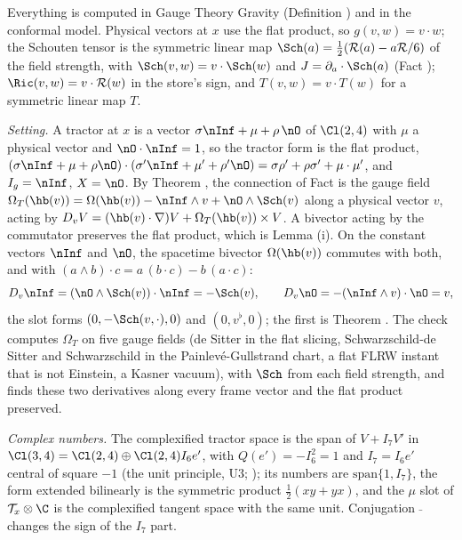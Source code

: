 Everything is computed in Gauge Theory Gravity (Definition ) and in the conformal model. Physical vectors at $x$ use the flat product, so $g(v, w) = v\cdot w$; the Schouten tensor is the symmetric linear map $\Sch(a) = \tfrac12(\mathcal{R}(a) - a\mathcal{R}/6)$ of the field strength, with $\Sch(v, w) = v\cdot\Sch(w)$ and $J = \partial_{a}\cdot\Sch(a)$ (Fact ); $\Ric(v, w) = v\cdot\mathcal{R}(w)$ in the store's sign, and $T(v, w) = v\cdot T(w)$ for a symmetric linear map $T$.

\emph{Setting.} A tractor at $x$ is a vector $\sigma\nInf + \mu + \rho\,\nO$ of $\Cl(2,4)$ with $\mu$ a physical vector and $\nO\cdot\nInf = 1$, so the tractor form is the flat product, $(\sigma\nInf + \mu + \rho\nO)\cdot(\sigma'\nInf + \mu' + \rho'\nO) = \sigma\rho' + \rho\sigma' + \mu\cdot\mu'$, and $I_g = \nInf$, $X = \nO$. By Theorem , the connection of Fact  is the gauge field $\Omega_{T}(\hb(v)) = \Omega(\hb(v)) - \nInf\wedge v + \nO\wedge\Sch(v)$ along a physical vector $v$, acting by $D_{v}V = (\hb(v)\cdot\nabla)V + \Omega_{T}(\hb(v))\times V$. A bivector acting by the commutator preserves the flat product, which is Lemma (i). On the constant vectors $\nInf$ and $\nO$, the spacetime bivector $\Omega(\hb(v))$ commutes with both, and with $(a\wedge b)\cdot c = a\,(b\cdot c) - b\,(a\cdot c)$:
\[
D_{v}\nInf = (\nO\wedge\Sch(v))\cdot\nInf = -\Sch(v), \qquad D_{v}\nO = -(\nInf\wedge v)\cdot\nO = v,
\]
the slot forms $(0, -\Sch(v,\cdot), 0)$ and $(0, v^{\flat}, 0)$; the first is Theorem . The check computes $\Omega_{T}$ on five gauge fields (de Sitter in the flat slicing, Schwarzschild-de Sitter and Schwarzschild in the Painlev\'e-Gullstrand chart, a flat FLRW instant that is not Einstein, a Kasner vacuum), with $\Sch$ from each field strength, and finds these two derivatives along every frame vector and the flat product preserved.

\emph{Complex numbers.} The complexified tractor space is the span of $V + I_{7}V'$ in $\Cl(3,4) = \Cl(2,4) \oplus \Cl(2,4)I_{6}e'$, with $Q(e') = -I_{6}^{2} = 1$ and $I_{7} = I_{6}e'$ central of square $-1$ (the unit principle, U3; ); its numbers are $\mathrm{span}\{1, I_{7}\}$, the form extended bilinearly is the symmetric product $\tfrac12(xy + yx)$, and the $\mu$ slot of $\mathcal{T}_x\otimes\C$ is the complexified tangent space with the same unit. Conjugation $\bar{\ }$ changes the sign of the $I_{7}$ part.


